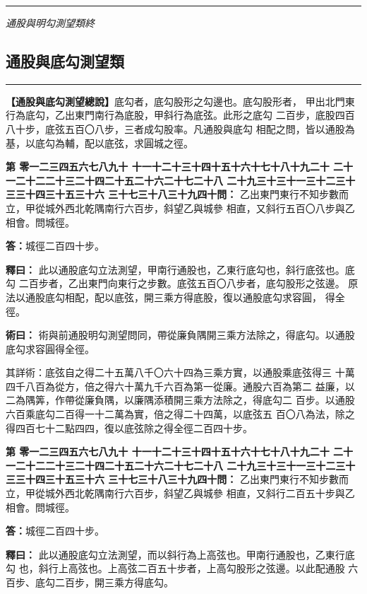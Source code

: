 \documentclass[11pt,a4paper]{article}
\newcommand{\longline}{\noindent\rule{\textwidth}{0.4pt}}
\newcounter{probnum}
\newcommand{\chnum}[1]{%
  \ifcase#1 零\or 一\or 二\or 三\or 四\or 五\or 六\or 七\or 八\or 九\or 十\or
    十一\or 十二\or 十三\or 十四\or 十五\or 十六\or 十七\or 十八\or 十九\or 二十\or
    二十一\or 二十二\or 二十三\or 二十四\or 二十五\or 二十六\or 二十七\or 二十八\or
    二十九\or 三十\or 三十一\or 三十二\or 三十三\or 三十四\or 三十五\or 三十六\or
    三十七\or 三十八\or 三十九\or 四十\fi}
\newcommand{\problem}[1]{\stepcounter{probnum}\par\noindent\textbf{第\chnum{\value{probnum}}問：}#1\par}
\newcommand{\answer}[1]{\par\noindent\textbf{答：}#1\par}
\newcommand{\shiyi}[1]{\par\noindent\textbf{釋曰：}#1\par}
\newcommand{\shuyue}[1]{\par\noindent\textbf{術曰：}#1\par}
\begin{document}
\vspace{0.5cm}
\longline
\begin{center}
\textit{通股與明勾測望類終}
\end{center}

\newpage
\setcounter{probnum}{0}

\subsection*{通股與底勾測望類}
\vspace{0.3cm}
\longline
\vspace{0.3cm}

\noindent
\textbf{【通股與底勾測望總說】}底勾者，底勾股形之勾邊也。底勾股形者，
甲出北門東行為底勾，乙出東門南行為底股，甲斜行為底弦。此形之底勾
二百步，底股四百八十步，底弦五百〇八步，三者成勾股率。凡通股與底勾
相配之問，皆以通股為基，以底勾為輔，配以底弦，求圓城之徑。

\problem{
乙出東門東行不知步數而立，甲從城外西北乾隅南行六百步，斜望乙與城參
相直，又斜行五百〇八步與乙相會。問城徑。
}

\answer{城徑二百四十步。}

\shiyi{
此以通股底勾立法測望，甲南行通股也，乙東行底勾也，斜行底弦也。底勾
二百步者，乙出東門向東行之步數。底弦五百〇八步者，底勾股形之弦邊。
原法以通股底勾相配，配以底弦，開三乘方得底股，復以通股底勾求容圓，
得全徑。
}

\shuyue{
術與前通股明勾測望問同，帶從廉負隅開三乘方法除之，得底勾。以通股
底勾求容圓得全徑。

其詳術：底弦自之得二十五萬八千〇六十四為三乘方實，以通股乘底弦得三
十萬四千八百為從方，倍之得六十萬九千六百為第一從廉。通股六百為第二
益廉，以二為隅筭，作帶從廉負隅，以廉隅添積開三乘方法除之，得底勾二
百步。以通股六百乘底勾二百得一十二萬為實，倍之得二十四萬，以底弦五
百〇八為法，除之得四百七十二點四四，復以底弦除之得全徑二百四十步。
}

\vspace{0.3cm}
\problem{
乙出東門東行不知步數而立，甲從城外西北乾隅南行六百步，斜望乙與城參
相直，又斜行二百五十步與乙相會。問城徑。
}

\answer{城徑二百四十步。}

\shiyi{
此以通股底勾立法測望，而以斜行為上高弦也。甲南行通股也，乙東行底勾
也，斜行上高弦也。上高弦二百五十步者，上高勾股形之弦邊。以此配通股
六百步、底勾二百步，開三乘方得底勾。
}
\end{document}
